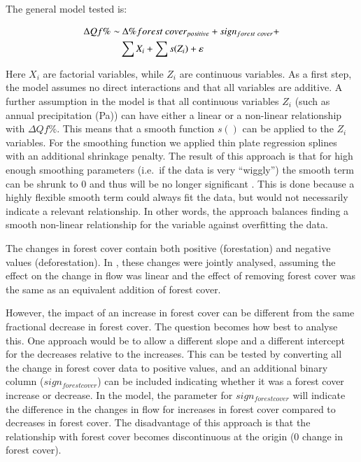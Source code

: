 \documentclass[]{elsarticle} %
\begin{document}
The general model tested is:

\begin{align}
\Delta Qf \% \sim &~ \Delta \% forest~cover_{positive} + sign_{forest~cover} + \notag \\ 
& \sum{X_i} + \sum{s(Z_i)} + \varepsilon \label{eq:eq2}
\end{align}

Here \(X_i\) are factorial variables, while \(Z_i\) are continuous variables. As a first step, the model assumes no direct interactions and that all variables are additive. A further assumption in the model is that all continuous variables \(Z_i\) (such as annual precipitation (Pa)) can have either a linear or a non-linear relationship with \(\Delta Qf \%\). This means that a smooth function \(s()\) can be applied to the \(Z_i\) variables. For the smoothing function we applied thin plate regression splines with an additional shrinkage penalty. The result of this approach is that for high enough smoothing parameters (i.e.~if the data is very ``wiggly'') the smooth term can be shrunk to 0 and thus will be no longer significant \citep{wood2006}. This is done because a highly flexible smooth term could always fit the data, but would not necessarily indicate a relevant relationship. In other words, the approach balances finding a smooth non-linear relationship for the variable against overfitting the data.

The changes in forest cover contain both positive (forestation) and negative values (deforestation). In \citet{zhang2017}, these changes were jointly analysed, assuming the effect on the change in flow was linear and the effect of removing forest cover was the same as an equivalent addition of forest cover.

However, the impact of an increase in forest cover can be different from the same fractional decrease in forest cover. The question becomes how best to analyse this. One approach would be to allow a different slope and a different intercept for the decreases relative to the increases.
This can be tested by converting all the change in forest cover data to positive values, and an additional binary column (\(sign_{forest cover}\)) can be included indicating whether it was a forest cover increase or decrease. In the model, the parameter for \(sign_{forest cover}\) will indicate the difference in the changes in flow for increases in forest cover compared to decreases in forest cover. The disadvantage of this approach is that the relationship with forest cover becomes discontinuous at the origin (0 change in forest cover).
\end{document}
